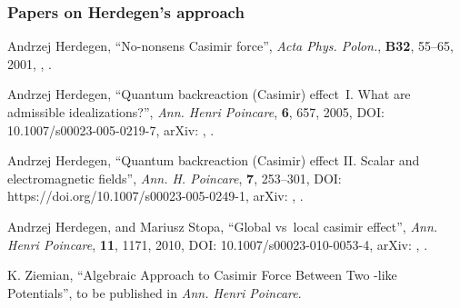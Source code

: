 \documentclass[10pt,t]{beamer}
\begin{document}
\begin{frame}
  \frametitle{Papers on Herdegen's approach}


  \begin{thebibliography}{99}

   Andrzej Herdegen,
    ``No-nonsens Casimir force'', \emph{Acta Phys. Polon.},
    \textbf{B32}, 55--65, 2001,
    ,
    \cite{HerdegenNononsensCasimirForce2001}.

   Andrzej Herdegen, ``Quantum
    backreaction (Casimir) effect~I. What are admissible
    idealizations?'', \emph{Ann. Henri Poincare}, \textbf{6}, 657,
    2005, DOI: 10.1007/s00023-005-0219-7, arXiv:
    ,
    \cite{HerdegenQuantumBackreactionI2005}.

   Andrzej Herdegen, ``Quantum
    backreaction (Casimir) effect II. Scalar and electromagnetic
    fields'', \emph{Ann. H. Poincare}, \textbf{7}, 253--301, DOI:
    https://doi.org/10.1007/s00023-005-0249-1, arXiv:
    ,
    \cite{HerdegenQuantumBackreactionII2006}.

   Andrzej Herdegen, and Mariusz
    Stopa, ``Global vs~local casimir effect'', \emph{Ann. Henri
      Poincare}, \textbf{11}, 1171, 2010, DOI:
    10.1007/s00023-010-0053-4, arXiv:
    ,
    \cite{HerdegenStopaGlobalVsLocal2010}.

   K. Ziemian, ``Algebraic Approach to Casimir
    Force Between Two \delta-like Potentials'', to be published in
    \emph{Ann. Henri Poincare}.

  \end{thebibliography}

\end{frame}
\end{document}
